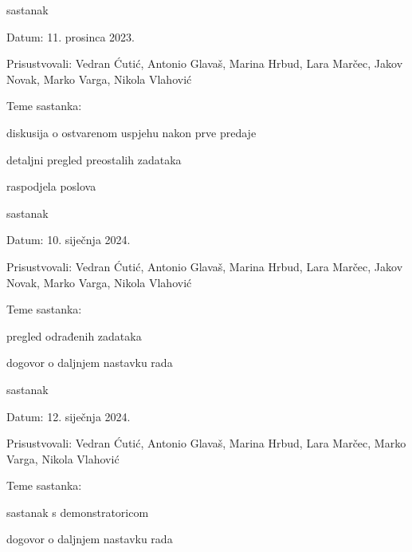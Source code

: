 \begin{packed_enum}
			\item  sastanak
			\item[] \begin{packed_item}
				\item Datum: 11. prosinca 2023.
				\item Prisustvovali: Vedran Ćutić, Antonio Glavaš, Marina Hrbud, Lara Marčec, Jakov Novak, Marko Varga, Nikola Vlahović
				\item Teme sastanka:
				\begin{packed_item}
					\item  diskusija o ostvarenom uspjehu nakon prve predaje
					\item  detaljni pregled preostalih zadataka
					\item  raspodjela poslova
				\end{packed_item}
			\end{packed_item}
			
			\item  sastanak
			\item[] \begin{packed_item}
				\item Datum: 10. siječnja 2024.
				\item Prisustvovali: Vedran Ćutić, Antonio Glavaš, Marina Hrbud, Lara Marčec, Jakov Novak, Marko Varga, Nikola Vlahović
				\item Teme sastanka:
				\begin{packed_item}
					\item  pregled odrađenih zadataka
					\item  dogovor o daljnjem nastavku rada
				\end{packed_item}
			\end{packed_item}

			\item  sastanak
			\item[] \begin{packed_item}
						\item Datum: 12. siječnja 2024.
						\item Prisustvovali: Vedran Ćutić, Antonio Glavaš, Marina Hrbud, Lara Marčec, Marko Varga, Nikola Vlahović
						\item Teme sastanka:
						\begin{packed_item}
							\item  sastanak s demonstratoricom
							\item  dogovor o daljnjem nastavku rada
						\end{packed_item}
			\end{packed_item}


\end{packed_enum}
